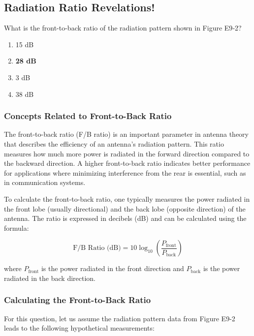 \subsection{Radiation Ratio Revelations!}

\begin{tcolorbox}[colback=gray!10, colframe=black, title=E9B04] What is the front-to-back ratio of the radiation pattern shown in Figure E9‑2? 

\begin{enumerate}[label=\Alph*.]
    \item 15 dB
    \item \textbf{28 dB}
    \item 3 dB
    \item 38 dB
\end{enumerate} \end{tcolorbox}

\subsubsection{Concepts Related to Front-to-Back Ratio}

The front-to-back ratio (F/B ratio) is an important parameter in antenna theory that describes the efficiency of an antenna's radiation pattern. This ratio measures how much more power is radiated in the forward direction compared to the backward direction. A higher front-to-back ratio indicates better performance for applications where minimizing interference from the rear is essential, such as in communication systems.

To calculate the front-to-back ratio, one typically measures the power radiated in the front lobe (usually directional) and the back lobe (opposite direction) of the antenna. The ratio is expressed in decibels (dB) and can be calculated using the formula:

\[
\text{F/B Ratio (dB)} = 10 \log_{10}\left(\frac{P_{\text{front}}}{P_{\text{back}}}\right)
\]

where \( P_{\text{front}} \) is the power radiated in the front direction and \( P_{\text{back}} \) is the power radiated in the back direction.

\subsubsection{Calculating the Front-to-Back Ratio}

For this question, let us assume the radiation pattern data from Figure E9-2 leads to the following hypothetical measurements: 

